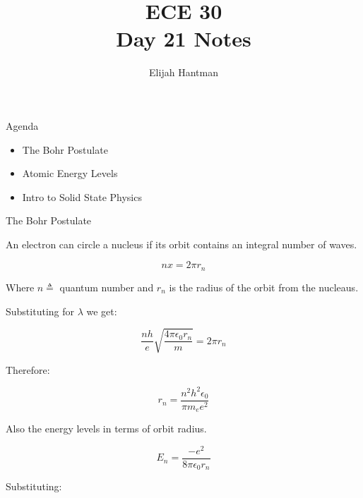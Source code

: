 \documentclass{report}
\title{\Huge{ECE 30}\\Day 21 Notes}
\author{\huge{Elijah Hantman}}
\date{}
\begin{document}
\maketitle
\newpage

\begin{description}
    \item {\large Agenda} 
        \begin{mdframed}
            \begin{itemize}
                \item The Bohr Postulate
                \item Atomic Energy Levels
                \item Intro to Solid State Physics
            \end{itemize}
        \end{mdframed}
    \item {\large The Bohr Postulate}
        \begin{mdframed}
            An electron can circle a nucleus if its orbit contains
            an integral number of waves.

            \begin{displaymath}
                nx = 2 \pi r_n
            \end{displaymath}

            Where $n \triangleq$ quantum number and
             $r_n$ is the radius of the orbit from the nucleaus.
            

             Substituting for $\lambda$ we get:

             \begin{displaymath}
                 \frac{nh}{e} \sqrt{\frac{4\pi \epsilon_0 r_n}{m}} = 2 \pi r_n
             \end{displaymath}
             
             Therefore:

             \begin{displaymath}
                 r_n = \frac{n^2 h^2 \epsilon_0}{\pi m_e e^2}
             \end{displaymath}
             
             Also the energy levels in terms of orbit radius.

             \begin{displaymath}
                 E_n = \frac{-e^2}{8 \pi \epsilon_0 r_n}
             \end{displaymath}

             Substituting:


\end{mdframed}
\end{description}
\end{document}
